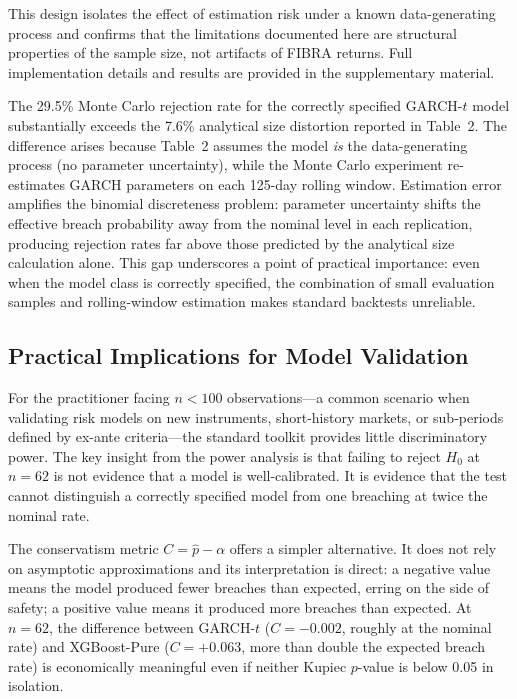 \documentclass[12pt,a4paper]{article}
\begin{document}
This design isolates the effect of estimation risk under a known data-generating process and confirms that the limitations documented here are structural properties of the sample size, not artifacts of FIBRA returns. Full implementation details and results are provided in the supplementary material.

The 29.5\% Monte Carlo rejection rate for the correctly specified GARCH-$t$ model substantially exceeds the 7.6\% analytical size distortion reported in Table~2. The difference arises because Table~2 assumes the model \textit{is} the data-generating process (no parameter uncertainty), while the Monte Carlo experiment re-estimates GARCH parameters on each 125-day rolling window. Estimation error amplifies the binomial discreteness problem: parameter uncertainty shifts the effective breach probability away from the nominal level in each replication, producing rejection rates far above those predicted by the analytical size calculation alone. This gap underscores a point of practical importance: even when the model class is correctly specified, the combination of small evaluation samples and rolling-window estimation makes standard backtests unreliable.

\subsection{Practical Implications for Model Validation}

For the practitioner facing $n < 100$ observations---a common scenario when validating risk models on new instruments, short-history markets, or sub-periods defined by ex-ante criteria---the standard toolkit provides little discriminatory power. The key insight from the power analysis is that failing to reject $H_0$ at $n = 62$ is not evidence that a model is well-calibrated. It is evidence that the test cannot distinguish a correctly specified model from one breaching at twice the nominal rate.

The conservatism metric $C = \hat{p} - \alpha$ offers a simpler alternative. It does not rely on asymptotic approximations and its interpretation is direct: a negative value means the model produced fewer breaches than expected, erring on the side of safety; a positive value means it produced more breaches than expected. At $n = 62$, the difference between GARCH-$t$ ($C = -0.002$, roughly at the nominal rate) and XGBoost-Pure ($C = +0.063$, more than double the expected breach rate) is economically meaningful even if neither Kupiec $p$-value is below 0.05 in isolation.
\end{document}

